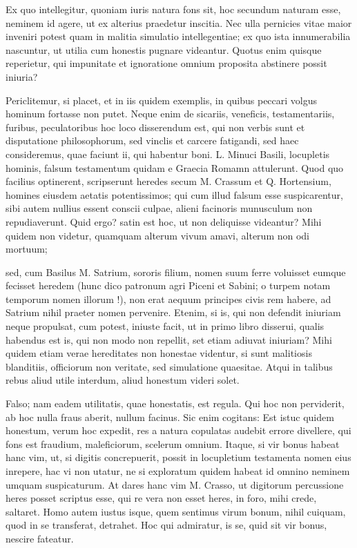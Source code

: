  Ex quo intellegitur, quoniam iuris natura fons sit, hoc secundum naturam esse, neminem id agere, ut ex alterius praedetur inscitia. Nec ulla pernicies vitae maior inveniri potest quam in malitia simulatio intellegentiae; ex quo ista innumerabilia nascuntur, ut utilia cum honestis pugnare videantur. Quotus enim quisque reperietur, qui impunitate et ignoratione omnium proposita abstinere possit iniuria?

 Periclitemur, si placet, et in iis quidem exemplis, in quibus peccari volgus hominum fortasse non putet. Neque enim de sicariis, veneficis, testamentariis, furibus, peculatoribus hoc loco disserendum est, qui non verbis sunt et disputatione philosophorum, sed vinclis et carcere fatigandi, sed haec consideremus, quae faciunt ii, qui habentur boni. L. Minuci Basili, locupletis hominis, falsum testamentum quidam e Graecia Romamn attulerunt. Quod quo facilius optinerent, scripserunt heredes secum M. Crassum et Q. Hortensium, homines eiusdem aetatis potentissimos; qui cum illud falsum esse suspicarentur, sibi autem nullius essent conscii culpae, alieni facinoris munusculum non repudiaverunt. Quid ergo? satin est hoc, ut non deliquisse videantur? Mihi quidem non videtur, quamquam alterum vivum amavi, alterum non odi mortuum;

 sed, cum Basilus M. Satrium, sororis filium, nomen suum ferre voluisset eumque fecisset heredem (hunc dico patronum agri Piceni et Sabini; o turpem notam temporum nomen illorum !), non erat aequum principes civis rem habere, ad Satrium nihil praeter nomen pervenire. Etenim, si is, qui non defendit iniuriam neque propulsat, cum potest, iniuste facit, ut in primo libro disserui, qualis habendus est is, qui non modo non repellit, set etiam adiuvat iniuriam? Mihi quidem etiam verae hereditates non honestae videntur, si sunt malitiosis blanditiis, officiorum non veritate, sed simulatione quaesitae. Atqui in talibus rebus aliud utile interdum, aliud honestum videri solet.

 Falso; nam eadem utilitatis, quae honestatis, est regula. Qui hoc non perviderit, ab hoc nulla fraus aberit, nullum facinus. Sic enim cogitans: Est istuc quidem honestum, verum hoc expedit, res a natura copulatas audebit errore divellere, qui fons est fraudium, maleficiorum, scelerum omnium. Itaque, si vir bonus habeat hanc vim, ut, si digitis concrepuerit, possit in locupletium testamenta nomen eius inrepere, hac vi non utatur, ne si exploratum quidem habeat id omnino neminem umquam suspicaturum. At dares hanc vim M. Crasso, ut digitorum percussione heres posset scriptus esse, qui re vera non esset heres, in foro, mihi crede, saltaret. Homo autem iustus isque, quem sentimus virum bonum, nihil cuiquam, quod in se transferat, detrahet. Hoc qui admiratur, is se, quid sit vir bonus, nescire fateatur.

